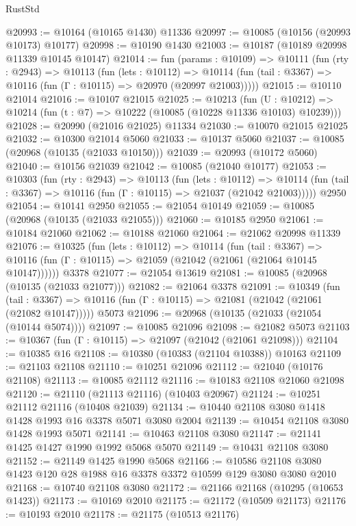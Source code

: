 \begin{lexlean}{RustStd}
\begin{coremodule}
@20993 := @10164 (@10165 @1430) @11336
@20997 := @10085 (@10156 (@20993 @10173) @10177)
@20998 := @10190 @1430
@21003 := @10187 (@10189 @20998 @11339 @10145 @10147)
@21014 := fun (params : @10109) =>
  @10111
    (fun (rty : @2943) =>
    @10113
      (fun (lets : @10112) =>
      @10114 (fun (tail : @3367) => @10116 (fun (Γ : @10115) => @20970 (@20997 @21003)))))
@21015 := @10110 @21014
@21016 := @10107 @21015
@21025 := @10213
    (fun (U : @10212) => @10214 (fun (t : @7) => @10222 (@10085 (@10228 @11336 @10103) @10239)))
@21028 := @20990 (@21016 @21025) @11334
@21030 := @10070 @21015 @21025
@21032 := @10300 @21014 @5060
@21033 := @10137 @5060
@21037 := @10085 (@20968 (@10135 (@21033 @10150)))
@21039 := @20993 (@10172 @5060)
@21040 := @10156 @21039
@21042 := @10085 (@21040 @10177)
@21053 := @10303
    (fun (rty : @2943) =>
    @10113
      (fun (lets : @10112) =>
      @10114 (fun (tail : @3367) => @10116 (fun (Γ : @10115) => @21037 (@21042 @21003)))))
    @2950
@21054 := @10141 @2950
@21055 := @21054 @10149
@21059 := @10085 (@20968 (@10135 (@21033 @21055)))
@21060 := @10185 @2950
@21061 := @10184 @21060
@21062 := @10188 @21060
@21064 := @21062 @20998 @11339
@21076 := @10325
    (fun (lets : @10112) =>
    @10114
      (fun (tail : @3367) =>
      @10116 (fun (Γ : @10115) => @21059 (@21042 (@21061 (@21064 @10145 @10147))))))
    @3378
@21077 := @21054 @13619
@21081 := @10085 (@20968 (@10135 (@21033 @21077)))
@21082 := @21064 @3378
@21091 := @10349
    (fun (tail : @3367) => @10116 (fun (Γ : @10115) => @21081 (@21042 (@21061 (@21082 @10147)))))
    @5073
@21096 := @20968 (@10135 (@21033 (@21054 (@10144 @5074))))
@21097 := @10085 @21096
@21098 := @21082 @5073
@21103 := @10367 (fun (Γ : @10115) => @21097 (@21042 (@21061 @21098)))
@21104 := @10385 @16
@21108 := @10380 (@10383 (@21104 @10388)) @10163
@21109 := @21103 @21108
@21110 := @10251 @21096
@21112 := @21040 (@10176 @21108)
@21113 := @10085 @21112
@21116 := @10183 @21108 @21060 @21098
@21120 := @21110 (@21113 @21116) (@10403 @20967)
@21124 := @10251 @21112 @21116 (@10408 @21039)
@21134 := @10440 @21108 @3080 @1418 @1428 @1993 @16 @3378 @5071 @3080 @2004
@21139 := @10454 @21108 @3080 @1428 @1993 @5071
@21141 := @10463 @21108 @3080
@21147 := @21141 @1425 @1427 @1990 @1992 @5068 @5070
@21149 := @10431 @21108 @3080
@21152 := @21149 @1425 @1990 @5068
@21166 := @10586 @21108 @3080 @1423 @120 @28 @1988 @16 @3378 @3372 @10599 @129 @3080 @3080 @2010
@21168 := @10740 @21108 @3080
@21172 := @21166 @21168 (@10295 (@10653 @1423))
@21173 := @10169 @2010
@21175 := @21172 (@10509 @21173)
@21176 := @10193 @2010
@21178 := @21175 (@10513 @21176)

\end{coremodule}
\end{lexlean}
